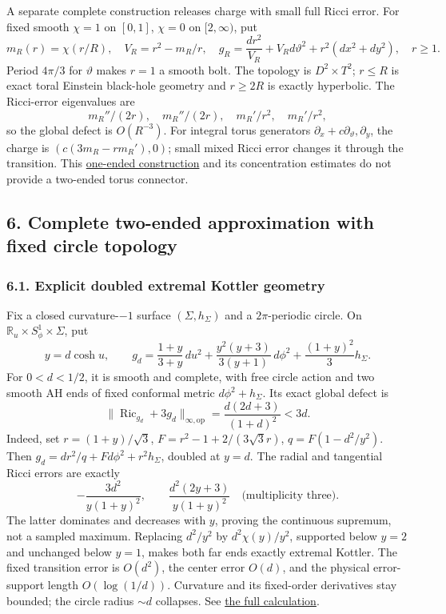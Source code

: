 \documentclass[
  english,
]{article}
\begin{document}
A separate complete construction releases charge with small full Ricci
error. For fixed smooth \(\chi=1\) on \([0,1]\), \(\chi=0\) on
\([2,\infty)\), put \[
m_R(r)=\chi(r/R),\quad V_R=r^2-m_R/r,\quad
g_R=\frac{dr^2}{V_R}+V_Rd\vartheta^2+r^2(dx^2+dy^2),\quad r\ge1.
\] Period \(4\pi/3\) for \(\vartheta\) makes \(r=1\) a smooth bolt. The
topology is \(D^2\times T^2\); \(r\le R\) is exact toral Einstein
black-hole geometry and \(r\ge2R\) is exactly hyperbolic. The
Ricci-error eigenvalues are \[
m_R''/(2r),\quad m_R''/(2r),\quad m_R'/r^2,\quad m_R'/r^2,
\] so the global defect is \(O(R^{-3})\). For integral torus generators
\(\partial_x+c\partial_\vartheta,\partial_y\), the charge is
\((c(3m_R-rm_R'),0)\); small mixed Ricci error changes it through the
transition. This \href{../proofs/round6_global.md}{one-ended
construction} and its concentration estimates do not provide a two-ended
torus connector.

\hypertarget{complete-two-ended-approximation-with-fixed-circle-topology}{%
\subsection{6. Complete two-ended approximation with fixed circle
topology}\label{complete-two-ended-approximation-with-fixed-circle-topology}}

\hypertarget{explicit-doubled-extremal-kottler-geometry}{%
\subsubsection{6.1. Explicit doubled extremal Kottler
geometry}\label{explicit-doubled-extremal-kottler-geometry}}

Fix a closed curvature-\(-1\) surface \((\Sigma,h_\Sigma)\) and a
\(2\pi\)-periodic circle. On \(\mathbb R_u\times S^1_\phi\times\Sigma\),
put \[
y=d\cosh u,\qquad
g_d=\frac{1+y}{3+y}\,du^2+
\frac{y^2(y+3)}{3(y+1)}\,d\phi^2+\frac{(1+y)^2}{3}h_\Sigma .
\tag{6.1}
\] For \(0<d<1/2\), it is smooth and complete, with free circle action
and two smooth AH ends of fixed conformal metric \(d\phi^2+h_\Sigma\).
Its exact global defect is \[
\|\operatorname{Ric}_{g_d}+3g_d\|_{\infty,\mathrm{op}}
=\frac{d(2d+3)}{(1+d)^2}<3d.
\tag{6.2}
\] Indeed, set \(r=(1+y)/\sqrt3\), \(F=r^2-1+2/(3\sqrt3r)\),
\(q=F(1-d^2/y^2)\). Then \(g_d=dr^2/q+Fd\phi^2+r^2h_\Sigma\), doubled at
\(y=d\). The radial and tangential Ricci errors are exactly \[
-\frac{3d^2}{y(1+y)^2},\qquad
\frac{d^2(2y+3)}{y(1+y)^2}\quad\text{(multiplicity three)}.
\] The latter dominates and decreases with \(y\), proving the continuous
supremum, not a sampled maximum. Replacing \(d^2/y^2\) by
\(d^2\chi(y)/y^2\), supported below \(y=2\) and unchanged below \(y=1\),
makes both far ends exactly extremal Kottler. The fixed transition error
is \(O(d^2)\), the center error \(O(d)\), and the physical error-support
length \(O(\log(1/d))\). Curvature and its fixed-order derivatives stay
bounded; the circle radius \(\sim d\) collapses. See
\href{../proofs/round10_kottler.md}{the full calculation}.
\end{document}

